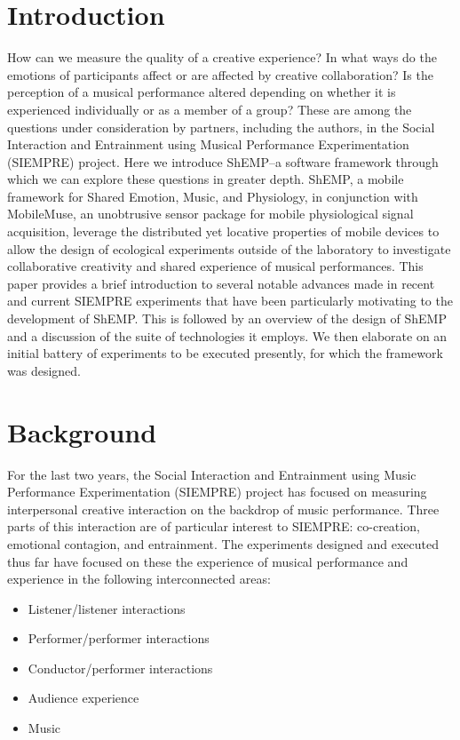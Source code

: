 \documentclass{sig-alternate}
\begin{document}
\section{Introduction}
How can we measure the quality of a creative experience?  In what ways do the emotions of participants affect or are affected by creative collaboration?  Is the perception of a musical performance altered depending on whether it is experienced individually or as a member of a group?  These are among the questions under consideration by partners, including the authors, in the Social Interaction and Entrainment using Musical Performance Experimentation (SIEMPRE) project.  Here we introduce ShEMP--a software framework through which we can explore these questions in greater depth.  ShEMP, a mobile framework for Shared Emotion, Music, and Physiology, in conjunction with MobileMuse, an unobtrusive sensor package for mobile physiological signal acquisition, leverage the distributed yet locative properties of mobile devices to allow the design of ecological experiments outside of the laboratory to investigate collaborative creativity and shared experience of musical performances.  This paper provides a brief introduction to several notable advances made in recent and current SIEMPRE experiments that have been particularly motivating to the development of ShEMP.  This is followed by an overview of the design of ShEMP and a discussion of the suite of technologies it employs.  We then elaborate on an initial battery of experiments to be executed presently, for which the framework was designed.

\section{Background}
For the last two years, the Social Interaction and Entrainment using Music Performance Experimentation (SIEMPRE) project has focused on measuring interpersonal creative interaction on the backdrop of music performance.  Three parts of this interaction are of particular interest to SIEMPRE: co-creation, emotional contagion, and entrainment.  The experiments designed and executed thus far have focused on these the experience of musical performance and experience in the following interconnected areas:

\begin{itemize}
	\item Listener/listener interactions
	\item Performer/performer interactions
	\item Conductor/performer interactions
	\item Audience experience
	\item Music
\end{itemize}
\end{document}
